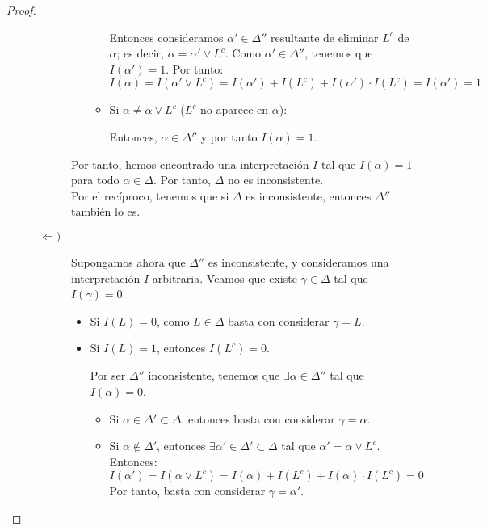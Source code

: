 \begin{teo}
\begin{proof}
\begin{description}
\begin{description}
\begin{itemize}
\begin{itemize}
                            Entonces consideramos $\alpha'\in \Delta''$ resultante de eliminar $L^c$ de $\alpha$; es decir, $\alpha=\alpha'\lor L^c$. Como $\alpha'\in \Delta''$, tenemos que $I(\alpha')=1$. Por tanto:
                            \begin{equation*}
                                I(\alpha)=I(\alpha'\lor L^c)=I(\alpha')+I(L^c)+I(\alpha')\cdot I(L^c)=I(\alpha')=1
                            \end{equation*}

                            \item Si $\alpha\neq \alpha\lor L^c$ ($L^c$ no aparece en $\alpha$):
                            
                            Entonces, $\alpha\in \Delta''$ y por tanto $I(\alpha)=1$.
                        \end{itemize}
                    \end{itemize}

                    Por tanto, hemos encontrado una interpretación $I$ tal que $I(\alpha)=1$ para todo $\alpha\in \Delta$. Por tanto, $\Delta$ no es inconsistente.\\

                    Por el recíproco, tenemos que si $\Delta$ es inconsistente, entonces $\Delta''$ también lo es.

                    \item[$\Longleftarrow)$] Supongamos ahora que $\Delta''$ es inconsistente, y consideramos una interpretación $I$ arbitraria. Veamos que existe $\gamma\in \Delta$ tal que $I(\gamma)=0$.
                    \begin{itemize}
                        \item Si $I(L)=0$, como $L\in \Delta$ basta con considerar $\gamma=L$.
                        \item Si $I(L)=1$, entonces $I(L^c)=0$.
                        
                        Por ser $\Delta''$ inconsistente, tenemos que $\exists \alpha\in \Delta''$ tal que $I(\alpha)=0$.
                        \begin{itemize}
                            \item Si $\alpha\in \Delta'\subset \Delta$, entonces basta con considerar $\gamma=\alpha$.
                            \item Si $\alpha\notin \Delta'$, entonces $\exists \alpha'\in \Delta'\subset \Delta$ tal que $\alpha'=\alpha\lor L^c$.
                            Entonces:
                            \begin{equation*}
                                I(\alpha')=I(\alpha\lor L^c)=I(\alpha)+I(L^c)+I(\alpha)\cdot I(L^c)=0
                            \end{equation*}
                            Por tanto, basta con considerar $\gamma=\alpha'$.
                        \end{itemize}
                    \end{itemize}


\end{description}
\end{description}
\end{proof}
\end{teo}
